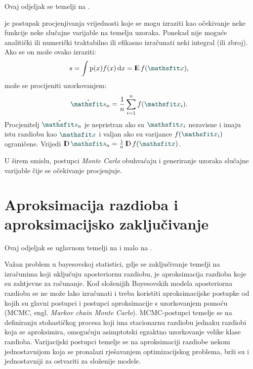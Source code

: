 \documentclass[utf8, diplomski, lmodern]{fer}
\begin{document}
Ovaj odjeljak se temelji na \citet[pododjeljak 17.1.2]{Goodfellow:2016:DL}.

 je postupak procjenjivanja vrijednosti koje se mogu izraziti kao očekivanje neke funkcije neke slučajne varijable na temelju uzoraka. Ponekad nije moguće analitički ili numerički traktabilno ili efikasno izračunati neki integral (ili zbroj). Ako se on može ovako izraziti:
\begin{align}
s = \int\p(x)f(x)\dif x = \E f(\rvar x) \text{,}
\end{align}
može se procijeniti uzorkovanjem:
\begin{align}
\hat{\rvar s}_n = \frac{1}{n}\sum_{i=1}^n f(\rvar x_i) \text{.}
\end{align}
Procjenitelj $\hat{\rvar s}_n$ je nepristran ako su $\rvar x_i$ nezavisne i imaju istu razdiobu kao $\rvar x$ i valjan ako su varijance $f(\rvar x_i)$ ograničene. Vrijedi $\D\hat{\rvar s}_n = \frac{1}{n} \D f(\rvar x)$.

U širem smislu, postupci \textit{Monte Carlo} obuhvaćaju i generiranje uzoraka slučajne varijable čije se očekivanje procjenjuje.


\section{Aproksimacija razdioba i aproksimacijsko zaključivanje} \label{sec:aproksimacija-razdioba}

Ovaj odjeljak se uglavnom temelji na \citet{Blei:2017:VIRS} i malo na \citet{Yang:2017:UVLB}.

Važan problem u bayesovskoj statistici, gdje se zaključivanje temelji na izračunima koji uključuju aposteriornu razdiobu, je aproksimacija razdioba koje su zahtjevne za računanje. Kod složenijih Bayesovskih modela aposteriorna razdioba se ne može lako izračunati i treba koristiti aproksimacijske postupke od kojih su glavni  postupci \citep{Jordan:1999:IVMGM} i postupci  aproksimacije s uzorkovanjem pomoću  (MCMC, engl. \textit{Markov chain Monte Carlo}). MCMC-postupci temelje se na definiranju stohastičkog procesa koji ima stacionarnu razdiobu jednaku razdiobi koja se aproksimira, omogućuju asimptotski egzaktno uzorkovanje velike klase razdioba. Varijacijski postupci temelje se na aproksimaciji razdiobe nekom jednostavnijom koja se pronalazi rješavanjem optimizacijskog problema, brži su i jednostavniji za ostvariti za složenije modele.
\end{document}
